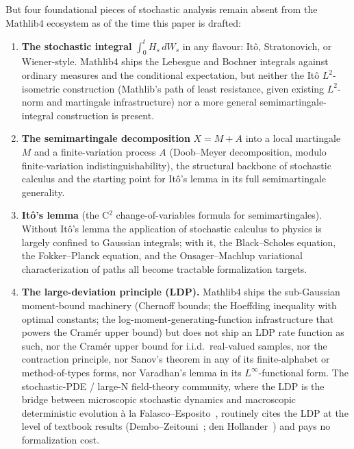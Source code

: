 \documentclass[11pt]{article}
\begin{document}
But four foundational pieces of stochastic analysis remain absent
from the Mathlib4 ecosystem as of the time this paper is drafted:

\begin{enumerate}
\item \textbf{The stochastic integral} $\int_0^t H_s\,dW_s$ in any
  flavour: It\^o, Stratonovich, or Wiener-style. Mathlib4 ships the
  Lebesgue and Bochner integrals against ordinary measures and the
  conditional expectation, but neither the It\^o $L^2$-isometric
  construction (Mathlib's path of least resistance, given existing
  $L^2$-norm and martingale infrastructure) nor a more general
  semimartingale-integral construction is present.
\item \textbf{The semimartingale decomposition} $X = M + A$ into a
  local martingale $M$ and a finite-variation process $A$ (Doob--Meyer
  decomposition, modulo finite-variation indistinguishability),
  the structural backbone of stochastic calculus and the starting
  point for It\^o's lemma in its full semimartingale generality.
\item \textbf{It\^o's lemma} (the C${}^2$ change-of-variables formula
  for semimartingales). Without It\^o's lemma the application of
  stochastic calculus to physics is largely confined to Gaussian
  integrals; with it, the Black--Scholes equation, the Fokker--Planck
  equation, and the Onsager--Machlup variational characterization of
  paths all become tractable formalization targets.
\item \textbf{The large-deviation principle (LDP).} Mathlib4 ships
  the sub-Gaussian moment-bound machinery (Chernoff bounds; the
  Hoeffding inequality with optimal constants; the
  log-moment-generating-function infrastructure that powers the
  Cram\'er upper bound) but does not ship an LDP rate function as
  such, nor the Cram\'er upper bound for i.i.d.\ real-valued samples,
  nor the contraction principle, nor Sanov's theorem in any of its
  finite-alphabet or method-of-types forms, nor Varadhan's lemma
  in its $L^\infty$-functional form. The stochastic-PDE / large-N
  field-theory community, where the LDP is the bridge between
  microscopic stochastic dynamics and macroscopic deterministic
  evolution \`a la
  Falasco--Esposito~\cite{FalascoEsposito2025RMP}, routinely
  cites the LDP at the level of textbook results
  (Dembo--Zeitouni~\cite{DemboZeitouni1998LDT}; den
  Hollander~\cite{denHollander2000LDPs}) and pays no formalization
  cost.
\end{enumerate}
\end{document}
